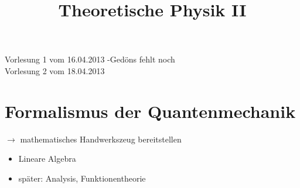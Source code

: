 \documentclass[10pt,article,colorback,accentcolor=tud9d]{scrartcl}
\title{Theoretische Physik II}
\begin{document}
\maketitle
\tableofcontents
\newpage
\noindent Vorlesung 1 vom 16.04.2013 -Gedöns fehlt noch\\
Vorlesung 2 vom 18.04.2013
\section{Formalismus der Quantenmechanik}
$\rightarrow$ mathematisches Handwerkszeug bereitstellen\\
\begin{itemize}
\item Lineare Algebra
\item später: Analysis, Funktionentheorie
\end{itemize}
\end{document}
